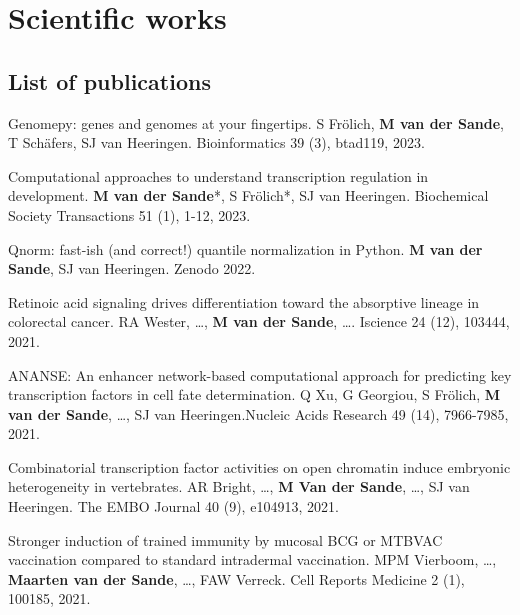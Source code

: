 \section{Scientific works}

\subsection{List of publications}

\noindent
Genomepy: genes and genomes at your fingertips. S Frölich, \textbf{M van der Sande}, T Schäfers, SJ van Heeringen. Bioinformatics 39 (3), btad119, 2023. \cite{Frlich2023}
\newline

\noindent
Computational approaches to understand transcription regulation in development. \textbf{M van der Sande}*, S Frölich*, SJ van Heeringen. Biochemical Society Transactions 51 (1), 1-12, 2023. \cite{vanderSande2023}
\newline

\noindent
Qnorm: fast-ish (and correct!) quantile normalization in Python. \textbf{M van der Sande}, SJ van Heeringen. Zenodo 2022. \cite{vanderSande2021}
\newline

\noindent
Retinoic acid signaling drives differentiation toward the absorptive lineage in colorectal cancer. RA Wester, \ldots, \textbf{M van der Sande}, \ldots. Iscience 24 (12), 103444, 2021. \cite{Wester2021}
\newline

\noindent
ANANSE: An enhancer network-based computational approach for predicting key transcription factors in cell fate determination. Q Xu, G Georgiou, S Frölich, \textbf{M van der Sande}, \ldots, SJ van Heeringen.Nucleic Acids Research 49 (14), 7966-7985, 2021. \cite{Xu_2020}
\newline

\noindent
Combinatorial transcription factor activities on open chromatin induce embryonic heterogeneity in vertebrates. AR Bright, \ldots, \textbf{M Van der Sande}, \ldots, SJ van Heeringen. The EMBO Journal 40 (9), e104913, 2021. \cite{Bright_2021}
\newline

\noindent
Stronger induction of trained immunity by mucosal BCG or MTBVAC vaccination compared to standard intradermal vaccination. MPM Vierboom, \ldots, \textbf{Maarten van der Sande}, \ldots, FAW Verreck. Cell Reports Medicine 2 (1), 100185, 2021. \cite{Vierboom2021}
\newline

